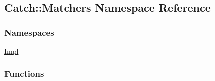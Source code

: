 \hypertarget{a00121}{}\subsection{Catch\+:\+:Matchers Namespace Reference}
\label{a00121}
\subsubsection*{Namespaces}
\begin{DoxyCompactItemize}
\item 
 \hyperlink{a00122}{Impl}
\end{DoxyCompactItemize}
\subsubsection*{Functions}
